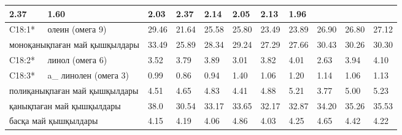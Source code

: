 \begin{table}[H]
{\begin{tabular}{|ll|lll|lll|lll|}
    \multicolumn{1}{l|}{2.37} &
    1.60 &
    \multicolumn{1}{l|}{2.03} &
    \multicolumn{1}{l|}{2.37} &
    2.14 &
    \multicolumn{1}{l|}{2.05} &
    \multicolumn{1}{l|}{2.13} &
    1.96 \\ \hline
  \multicolumn{1}{|l|}{C18:1*} &
    олеин (омега 9) &
    \multicolumn{1}{l|}{29.46} &
    \multicolumn{1}{l|}{21.64} &
    25.58 &
    \multicolumn{1}{l|}{25.80} &
    \multicolumn{1}{l|}{23.49} &
    23.89 &
    \multicolumn{1}{l|}{26.90} &
    \multicolumn{1}{l|}{26.80} &
    27.12 \\ \hline
  \multicolumn{2}{|l|}{моноқанықпаған май қышқылдары} &
    \multicolumn{1}{l|}{33.49} &
    \multicolumn{1}{l|}{25.89} &
    28.34 &
    \multicolumn{1}{l|}{29.24} &
    \multicolumn{1}{l|}{27.29} &
    27.66 &
    \multicolumn{1}{l|}{30.43} &
    \multicolumn{1}{l|}{30.26} &
    30.30 \\ \hline
  \multicolumn{1}{|l|}{C18:2*} &
    линол (омега 6) &
    \multicolumn{1}{l|}{3.52} &
    \multicolumn{1}{l|}{3.79} &
    3.89 &
    \multicolumn{1}{l|}{3.01} &
    \multicolumn{1}{l|}{3.82} &
    4.01 &
    \multicolumn{1}{l|}{2.63} &
    \multicolumn{1}{l|}{3.94} &
    4.10 \\ \hline
  \multicolumn{1}{|l|}{C18:3*} &
    a\_ линолен (омега 3) &
    \multicolumn{1}{l|}{0.99} &
    \multicolumn{1}{l|}{0.86} &
    0.94 &
    \multicolumn{1}{l|}{1.40} &
    \multicolumn{1}{l|}{1.06} &
    1.20 &
    \multicolumn{1}{l|}{1.14} &
    \multicolumn{1}{l|}{1.06} &
    1.13 \\ \hline
  \multicolumn{2}{|l|}{полиқанықпаған май қышқылдары} &
    \multicolumn{1}{l|}{4.51} &
    \multicolumn{1}{l|}{4.65} &
    4.83 &
    \multicolumn{1}{l|}{4.41} &
    \multicolumn{1}{l|}{4.88} &
    5.21 &
    \multicolumn{1}{l|}{3.77} &
    \multicolumn{1}{l|}{5.00} &
    5.23 \\ \hline
  \multicolumn{2}{|l|}{қанықпаған май қышқылдары} &
    \multicolumn{1}{l|}{38.0} &
    \multicolumn{1}{l|}{30.54} &
    33.17 &
    \multicolumn{1}{l|}{33.65} &
    \multicolumn{1}{l|}{32.17} &
    32.87 &
    \multicolumn{1}{l|}{34.20} &
    \multicolumn{1}{l|}{35.26} &
    35.53 \\ \hline
  \multicolumn{2}{|l|}{басқа май қышқылдары} &
    \multicolumn{1}{l|}{4.15} &
    \multicolumn{1}{l|}{4.19} &
    4.06 &
    \multicolumn{1}{l|}{4.86} &
    \multicolumn{1}{l|}{4.03} &
    4.25 &
    \multicolumn{1}{l|}{4.65} &
    \multicolumn{1}{l|}{4.42} &
    4.22 \\ \hline
  \end{tabular}
  }
  \end{table}
  


